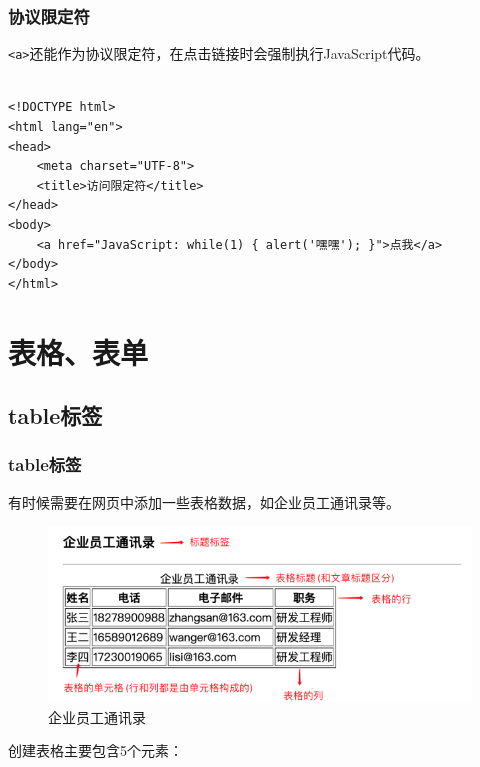 \subsection{协议限定符}

\lstinline|<a>|还能作为协议限定符，在点击链接时会强制执行JavaScript代码。 \\

 \\
\begin{lstlisting}[style=htmlcssjs]
<!DOCTYPE html>
<html lang="en">
<head>
    <meta charset="UTF-8">
    <title>访问限定符</title>
</head>
<body>
    <a href="JavaScript: while(1) { alert('嘿嘿'); }">点我</a>
</body>
</html>
\end{lstlisting}

\newpage

\chapter{表格、表单}

\section{table标签}

\subsection{table标签}

有时候需要在网页中添加一些表格数据，如企业员工通讯录等。

\begin{figure}[H]
    \centering
    \includegraphics[scale=0.9]{img/C4/4-1/1.png}
    \caption{企业员工通讯录}
\end{figure}

创建表格主要包含5个元素：

